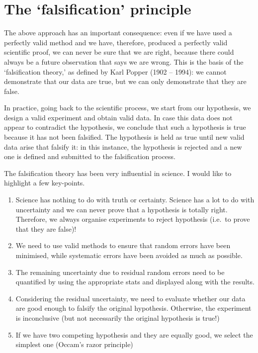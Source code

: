 \documentclass[a4paper,12pt,oneside]{book}
\providecommand{\tightlist}{%
  \setlength{\itemsep}{0pt}\setlength{\parskip}{0pt}}
\begin{document}
\hypertarget{the-falsification-principle}{%
\section{The `falsification' principle}\label{the-falsification-principle}}

The above approach has an important consequence: even if we have used a perfectly valid method and we have, therefore, produced a perfectly valid scientific proof, we can never be sure that we are right, because there could always be a future observation that says we are wrong. This is the basis of the `falsification theory,' as defined by Karl Popper (1902 -- 1994): we cannot demonstrate that our data are true, but we can only demonstrate that they are false.

In practice, going back to the scientific process, we start from our hypothesis, we design a valid experiment and obtain valid data. In case this data does not appear to contradict the hypothesis, we conclude that such a hypothesis is true because it has not been falsified. The hypothesis is held as true until new valid data arise that falsify it: in this instance, the hypothesis is rejected and a new one is defined and submitted to the falsification process.

The falsification theory has been very influential in science. I would like to highlight a few key-points.

\begin{enumerate}
\def\labelenumi{\arabic{enumi}.}
\tightlist
\item
  Science has nothing to do with truth or certainty. Science has a lot to do with uncertainty and we can never prove that a hypothesis is totally right. Therefore, we always organise experiments to reject hypothesis (i.e.~to prove that they are false)!
\item
  We need to use valid methods to ensure that random errors have been minimised, while systematic errors have been avoided as much as possible.
\item
  The remaining uncertainty due to residual random errors need to be quantified by using the appropriate stats and displayed along with the results.
\item
  Considering the residual uncertainty, we need to evaluate whether our data are good enough to falsify the original hypothesis. Otherwise, the experiment is inconclusive (but not necessarily the original hypothesis is true!)
\item
  If we have two competing hypothesis and they are equally good, we select the simplest one (Occam's razor principle)
\end{enumerate}
\end{document}
